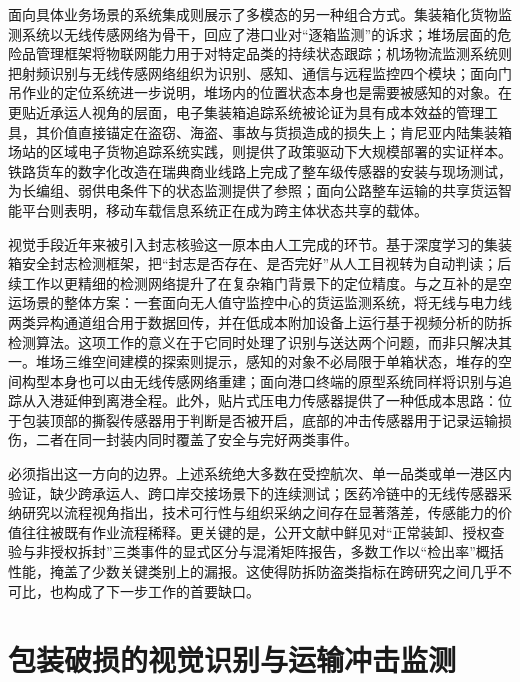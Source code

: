 \documentclass[11pt,a4paper]{article}
\begin{document}
面向具体业务场景的系统集成则展示了多模态的另一种组合方式。集装箱化货物监测系统以无线传感网络为骨干，回应了港口业对“逐箱监测”的诉求\cite{doiijccc201142109}；堆场层面的危险品管理框架将物联网能力用于对特定品类的持续状态跟踪\cite{doi20165083074}；机场物流监测系统则把射频识别与无线传感网络组织为识别、感知、通信与远程监控四个模块\cite{doiijoev14i018058}；面向门吊作业的定位系统进一步说明，堆场内的位置状态本身也是需要被感知的对象\cite{doiijoev14i058645}。在更贴近承运人视角的层面，电子集装箱追踪系统被论证为具有成本效益的管理工具，其价值直接锚定在盗窃、海盗、事故与货损造成的损失上\cite{doinodoi542}；肯尼亚内陆集装箱场站的区域电子货物追踪系统实践，则提供了政策驱动下大规模部署的实证样本\cite{doiaqssr225}。铁路货车的数字化改造在瑞典商业线路上完成了整车级传感器的安装与现场测试，为长编组、弱供电条件下的状态监测提供了参照\cite{dois23177448}；面向公路整车运输的共享货运智能平台则表明，移动车载信息系统正在成为跨主体状态共享的载体\cite{dois10257022005725}。

视觉手段近年来被引入封志核验这一原本由人工完成的环节。基于深度学习的集装箱安全封志检测框架，把“封志是否存在、是否完好”从人工目视转为自动判读\cite{doiicievicivpr5257820219564}；后续工作以更精细的检测网络提升了在复杂箱门背景下的定位精度\cite{doitim20213117629}。与之互补的是空运场景的整体方案：一套面向无人值守监控中心的货运监测系统，将无线与电力线两类异构通道组合用于数据回传，并在低成本附加设备上运行基于视频分析的防拆检测算法\cite{doisies20188442087}。这项工作的意义在于它同时处理了识别与送达两个问题，而非只解决其一。堆场三维空间建模的探索则提示，感知的对象不必局限于单箱状态，堆存的空间构型本身也可以由无线传感网络重建\cite{doinodoi526}；面向港口终端的原型系统同样将识别与追踪从入港延伸到离港全程\cite{doiwwdt7647}。此外，贴片式压电力传感器提供了一种低成本思路：位于包装顶部的撕裂传感器用于判断是否被开启，底部的冲击传感器用于记录运输损伤，二者在同一封装内同时覆盖了安全与完好两类事件\cite{doinems20167758259}。

必须指出这一方向的边界。上述系统绝大多数在受控航次、单一品类或单一港区内验证，缺少跨承运人、跨口岸交接场景下的连续测试；医药冷链中的无线传感器采纳研究以流程视角指出，技术可行性与组织采纳之间存在显著落差，传感能力的价值往往被既有作业流程稀释\cite{dois071818762013000200011}。更关键的是，公开文献中鲜见对“正常装卸、授权查验与非授权拆封”三类事件的显式区分与混淆矩阵报告，多数工作以“检出率”概括性能，掩盖了少数关键类别上的漏报。这使得防拆防盗类指标在跨研究之间几乎不可比，也构成了下一步工作的首要缺口。

\section{包装破损的视觉识别与运输冲击监测}
\end{document}
